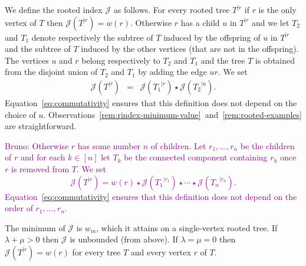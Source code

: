 \documentclass[11 pt]{modarticle}
\newcommand{\cR}{\mathbb{R}}
\newcommand{\wmap}{w}
\newcommand{\wmin}{w_m}
\newcommand{\rtree}[2]{{#1}^{\lvert #2}}
\newcommand{\ourproduct}{b}
\newcommand{\rindexsymbol}{\mathcal{J}}
\newcommand{\rindex}[2]{\rindexsymbol(\rtree{#2}{#1})}
\newcommand{\bldcomment}[1]{\textcolor{purple}{{\footnotesize Bruno:} #1}}
\begin{document}
We define the rooted index $\rindexsymbol$ as follows. For every rooted tree $\rtree{T}{r}$ if $r$ is the only vertex of $T$ then $\rindex{r}{T} = \wmap(r)$. Otherwise $r$ has a child $u$ in $\rtree{T}{r}$ and we let $T_2$ and $T_1$ denote respectively the subtree of $T$ induced by the offspring of $u$ in $\rtree{T}{r}$ and the subtree of $T$ induced by the other vertices (that are not in the offspring). The vertices $u$ and $r$ belong respectively to $T_2$ and $T_1$ and the tree $T$ is obtained from the disjoint union of $T_2$ and $T_1$ by adding the edge $ur$. We set
\begin{eqnarray}
	\rindex{r}{T} & = & \rindex{r}{T_1} \star \rindex{u}{T_2}. \label{eq:rindex-tree-decomp}
\end{eqnarray}
Equation~\eqref{eq:commutativity} ensures that this definition does not depend on the choice of $u$. Observations~\ref{rem:rindex-minimum-value}~and~\ref{rem:rooted-examples} are straightforward.

\bldcomment{
Otherwise $r$ has some number $n$ of children. Let $r_1,\dots,r_n$ be the children of $r$ and for each $k\in[n]$ let $T_k$ be the connected component containing $r_k$ once $r$ is removed from $T$. We set
\[
\rindex{r}{T}  =  \wmap(r) \star \rindex{r_1}{T_1} \star \cdots \star \rindex{r_n}{T_n}. \label{eq:rindex-tree-fulldecomp}
\]
Equation~\eqref{eq:commutativity} ensures that this definition does not depend on the order of $r_1,\dots, r_n$.
}

\begin{rem}\label{rem:rindex-minimum-value}
The minimum of $\rindexsymbol$ is $\wmin$, which it attains on a single-vertex rooted tree. If $\lambda + \mu > 0$ then $\rindexsymbol$ is unbounded (from above). If $\lambda = \mu = 0$ then $\rindex{r}{T} = \wmap(r)$ for every tree $T$ and every vertex $r$ of $T$.
\end{rem}
\end{document}
